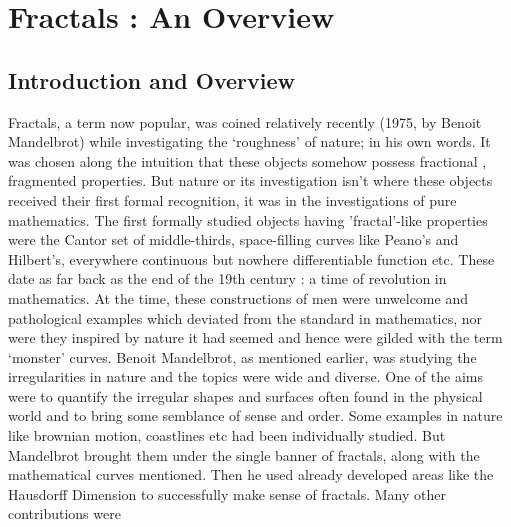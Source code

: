 
\chapter{Fractals : An Overview} %

\label{Chapter3} %


\section{Introduction and Overview}
Fractals, a term now popular, was coined relatively recently (1975, by Benoit
Mandelbrot) while investigating the `roughness' of nature; in his own words.
It was chosen along the intuition that these objects somehow possess fractional
, fragmented properties.
\newline
But nature or its investigation isn't where these objects received their first
formal recognition, it was in the investigations of pure mathematics. The first
formally studied objects having 'fractal'-like properties were the Cantor set of
middle-thirds, space-filling curves like Peano's and Hilbert's,
everywhere continuous but nowhere differentiable function etc. These date as far
back as the end of the 19th century : a time of revolution in mathematics. 
At the time, these constructions of men
were unwelcome and pathological examples which deviated from the standard in
mathematics, nor were they inspired by nature it had
seemed and hence were gilded with
the term `monster' curves.\cite{mandelbrot}
\newline
Benoit Mandelbrot, as mentioned earlier, was studying the irregularities in
nature and the topics were wide and diverse. One of the aims were to quantify
the irregular shapes and surfaces often found in the physical world
and to bring some semblance of sense and order. Some examples in nature like
brownian motion, coastlines etc had been individually studied. But Mandelbrot
brought them under the single banner of fractals, along with the mathematical
curves mentioned. Then he used already developed areas like the Hausdorff
Dimension to successfully make sense of fractals. Many other contributions were
